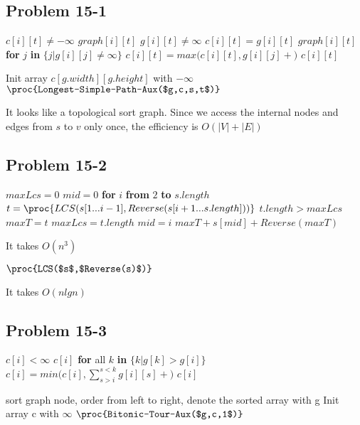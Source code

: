 \documentclass[12pt]{article}
\theoremstyle{definition}
\theoremstyle{remark}
\begin{document}
\subsection*{Problem 15-1}
\begin{codebox}
\li \If $c[i][t]\ne -\infty$ \label{li:if}
\li \quad \Return $graph[i][t]$
\li \If $g[i][t]\ne \infty$ \label{li:if}
\li \quad $c[i][t]=g[i][t]$
\li \quad \Return $graph[i][t]$
\li \textbf{for} $j$ \textbf{in} $\{j|g[i][j]\ne \infty\}$
\li \quad $c[i][t]=max(c[i][t],g[i][j]+$$)$
\li \quad \Return $c[i][t]$
\end{codebox}
\begin{codebox}
\li Init array $c[g.width][g.height]$ with $-\infty$
\li \Return $\proc{Longest-Simple-Path-Aux($g,c,s,t$)}$
\end{codebox}
It looks like a topological sort graph. Since we access the internal nodes and edges from $s$ to $v$ only once, the efficiency is $O(|V|+|E|)$
\subsection*{Problem 15-2}
\begin{codebox}
\li $maxLcs=0$
\li $mid=0$
\li \textbf{for} $i$ \textbf{from} $2$ \textbf{to} $s.length$
\li \quad $t=\proc{LCS(s[1...i-1],Reverse(s[i+1...s.length]))}$
\li \quad \If $t.length>maxLcs$ \label{li:if}
\li \qquad $maxT=t$
\li \qquad $maxLcs=t.length$
\li \qquad $mid=i$
\li \Return $maxT+s[mid]+Reverse(maxT)$
\end{codebox}
It takes $O(n^3)$
\begin{codebox}
\li $\proc{LCS($s$,$Reverse(s)$)}$
\end{codebox}
It takes $O(nlgn)$
\subsection*{Problem 15-3}
\begin{codebox}
\li \If $c[i]<\infty$ \label{li:if}
\li \quad \Return $c[i]$
\li \textbf{for} all $k$ \textbf{in} $\{k|g[k]>g[i]\}$
\li \quad $c[i]=min(c[i],\sum_{s>i}^{s<k}g[i][s]+$$)$
\li \Return $c[i]$
\end{codebox}
\begin{codebox}
\li sort graph node, order from left to right, denote the sorted array with g
\li Init array c with $\infty$
\li $\proc{Bitonic-Tour-Aux($g,c,1$)}$
\end{codebox}
\end{document}
